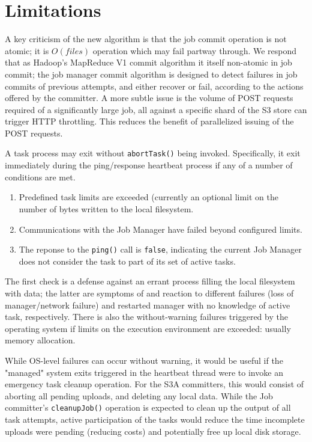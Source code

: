 \documentclass[conference]{IEEEtran}
\begin{document}

\section{Limitations}
\label{sec:limitations}

A key criticism of the new algorithm is that the job commit operation is not atomic;
it is $O(files)$ operation which may fail partway through.
We respond that as Hadoop's MapReduce V1 commit algorithm it itself non-atomic in job commit;
the job manager commit algorithm is designed to detect failures in job commits
of previous attempts, and either recover or fail, according to the actions
offered by the committer.
A more subtle issue is the volume of POST requests required of a significantly large job,
all against a specific shard of the S3 store can trigger HTTP throttling.
This reduces the benefit of parallelized issuing of the POST requests.

A task process may exit without \texttt{abortTask()} being invoked.
Specifically, it exit immediately during the ping/response
heartbeat process if any of a number of conditions are met.

\begin{enumerate}
  \item Predefined task limits are exceeded
  (currently an optional limit on the number of bytes written to the local filesystem.
  \item Communications with the Job Manager have failed beyond configured limits.
  \item The reponse to the \texttt{ping()} call is \texttt{false}, indicating the current
  Job Manager does not consider the task to part of its set of active tasks.
\end{enumerate}

The first check is a defense against an errant process filling the local
filesystem with data;
the latter are symptoms of and reaction to different failures (loss of manager/network failure)
and restarted manager with no knowledge of active task, respectively.
There is also the without-warning failures triggered by the operating system
if limits on the execution environment are exceeded: usually memory allocation.

While OS-level failures can occur without warning, it would be useful if the
"managed" system exits triggered in the heartbeat thread were to invoke
an emergency task cleanup operation.
For the S3A committers, this would consist of aborting all pending uploads, and
deleting any local data.
While the Job committer's \texttt{cleanupJob()} operation is expected to clean up
the output of all task attempts, active participation of the tasks would
reduce the time incomplete uploads were pending (reducing costs) and
potentially free up local disk storage.
\end{document}
